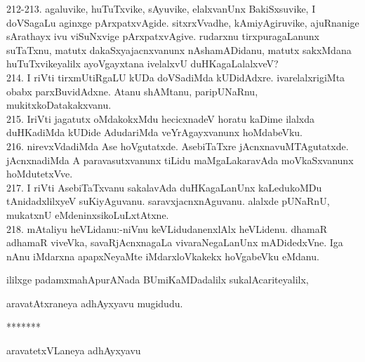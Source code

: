 \documentclass{article}
\begin{document}
212-213. agaluvike, huTuTxvike, sAyuvike, elalxvanUnx BakiSxsuvike, I doVSagaLu aginxge pArxpatxvAgide. sitxrxVvadhe, kAmiyAgiruvike, ajuRnanige sArathayx ivu viSuNxvige pArxpatxvAgive. rudarxnu tirxpuragaLanunx suTaTxnu, matutx dakaSxyajacnxvanunx nAshamADidanu, matutx sakxMdana huTuTxvikeyalilx ayoVgayxtana ivelalxvU duHKagaLalalxveV?\\
214. I riVti tirxmUtiRgaLU kUDa doVSadiMda kUDidAdxre. ivarelalxrigiMta obabx parxBuvidAdxne. Atanu shAMtanu, paripUNaRnu, mukitxkoDatakakxvanu.\\
215. IriVti jagatutx oMdakokxMdu hecicxnadeV horatu kaDime ilalxda duHKadiMda kUDide AdudariMda veYrAgayxvanunx hoMdabeVku.\\
216. nirevxVdadiMda Ase hoVgutatxde. AsebiTaTxre jAcnxnavuMTAgutatxde. jAcnxnadiMda A paravasutxvanunx tiLidu maMgaLakaravAda moVkaSxvanunx hoMdutetxVve.\\
217. I riVti AsebiTaTxvanu sakalavAda duHKagaLanUnx kaLedukoMDu tAnidadxlilxyeV suKiyAguvanu. saravxjacnxnAguvanu. alalxde pUNaRnU, mukatxnU eMdeninxsikoLuLxtAtxne.\\
218. mAtaliyu heVLidanu:-niVnu keVLidudanenxlAlx heVLidenu. dhamaR adhamaR viveVka, savaRjAcnxnagaLa vivaraNegaLanUnx mADidedxVne. Iga nAnu iMdarxna apapxNeyaMte iMdarxloVkakekx hoVgabeVku eMdanu.\\

\begin{center}
ililxge padamxmahApurANada BUmiKaMDadalilx sukalAcariteyalilx,
\end{center}

\begin{center}
aravatAtxraneya adhAyxyavu mugidudu.
\end{center}

\begin{center}
*******
\end{center}

\begin{center}
aravatetxVLaneya adhAyxyavu
\end{center}
\end{document}
